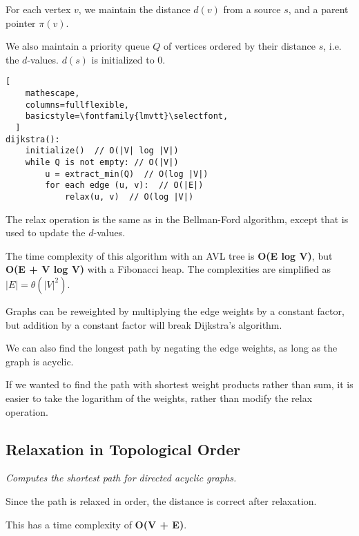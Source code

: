 For each vertex $v$, we maintain the distance $d(v)$ from a source $s$, and a parent pointer $\pi(v)$.

We also maintain a priority queue $Q$ of vertices ordered by their distance $s$, i.e. the $d$-values.
$d(s)$ is initialized to 0.

\begin{lstlisting}[
    mathescape,
    columns=fullflexible,
    basicstyle=\fontfamily{lmvtt}\selectfont,
  ]
dijkstra():
    initialize()  // O(|V| log |V|)
    while Q is not empty: // O(|V|)
        u = extract_min(Q)  // O(log |V|)
        for each edge (u, v):  // O(|E|)
            relax(u, v)  // O(log |V|)
\end{lstlisting}

The relax operation is the same as in the Bellman-Ford algorithm, 
except that  is used to update the $d$-values.

The time complexity of this algorithm with an AVL tree is \textbf{O(E log V)},
but \textbf{O(E + V log V)} with a Fibonacci heap.
The complexities are simplified as $|E| = \theta(|V|^2)$.

Graphs can be reweighted by multiplying the edge weights by a constant factor,
but addition by a constant factor will break Dijkstra's algorithm.

We can also find the longest path by negating the edge weights, as long as the graph is acyclic.

If we wanted to find the path with shortest weight products rather than sum,
it is easier to take the logarithm of the weights, rather than modify the relax operation.

\subsection{Relaxation in Topological Order}
\emph{Computes the shortest path for directed acyclic graphs.}

Since the path is relaxed in order, the distance is correct after relaxation.

This has a time complexity of \textbf{O(V + E)}.